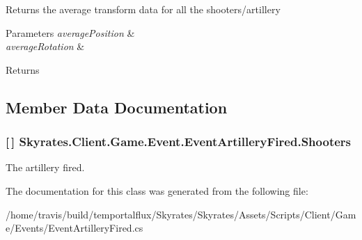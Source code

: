Returns the average transform data for all the shooters/artillery 


\begin{DoxyParams}{Parameters}
{\em average\-Position} & \\
\hline
{\em average\-Rotation} & \\
\hline
\end{DoxyParams}
\begin{DoxyReturn}{Returns}

\end{DoxyReturn}


\subsection{Member Data Documentation}
\hypertarget{class_skyrates_1_1_client_1_1_game_1_1_event_1_1_event_artillery_fired_a9f5e4a291e93d6611f840341b84a78e6}{
\subsubsection[{Shooters}]{ \mbox{[}$\,$\mbox{]} Skyrates.\-Client.\-Game.\-Event.\-Event\-Artillery\-Fired.\-Shooters}}\label{class_skyrates_1_1_client_1_1_game_1_1_event_1_1_event_artillery_fired_a9f5e4a291e93d6611f840341b84a78e6}


The artillery fired. 



The documentation for this class was generated from the following file\-:\begin{DoxyCompactItemize}
\item 
/home/travis/build/temportalflux/\-Skyrates/\-Skyrates/\-Assets/\-Scripts/\-Client/\-Game/\-Events/Event\-Artillery\-Fired.\-cs\end{DoxyCompactItemize}
